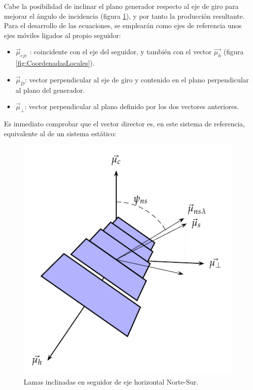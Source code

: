 Cabe la posibilidad de inclinar el plano generador respecto al eje
de giro para mejorar el ángulo de incidencia (figura \ref{fig:SeguidoresNSInclinado}),
y por tanto la producción resultante. Para el desarrollo de las ecuaciones,
se emplearán como ejes de referencia unos ejes móviles ligados al
propio seguidor:
\begin{itemize}
\item $\vec{\mu}_{eje}$
: coincidente con el eje del seguidor, y también con el vector $\vec{\mu_{h}}$
(figura \ref{fig:CoordenadasLocales}).
\item $\vec{\mu}_{D}$:
vector perpendicular al eje de giro y contenido en el plano perpendicular
al plano del generador.
\item $\vec{\mu}_{\bot}$: vector perpendicular al plano definido por los
dos vectores anteriores.
\end{itemize}
Es inmediato comprobar que el vector director es, en este sistema
de referencia, equivalente al de un sistema estático:

%
\begin{figure}
\includegraphics{../figs/AngulosSistemaHorizontalNSLamasInclinadas}

\caption{Lamas inclinadas en seguidor de eje horizontal Norte-Sur.\label{fig:SeguidoresNSInclinado}}

\end{figure}


